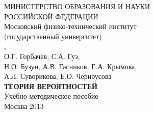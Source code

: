 \begin{center}

МИНИСТЕРСТВО ОБРАЗОВАНИЯ И НАУКИ \\
РОССИЙСКОЙ ФЕДЕРАЦИИ \\

 $ $ \\

Московский физико-технический институт \\
(государственный университет) \\
 
  $ $ \\ $ $ \\ $ $ \\
  $ $ \\
[А.А. Натан], \\
О.Г. Горбачев, С.А. Гуз, \\
Н.О. Бузун, А.В. Гасников, Е.А. Крымова, \\
А.Л. Суворикова, Е.О. Черноусова \\
 
 $ $ \\ $ $ \\
 
\textbf{ТЕОРИЯ ВЕРОЯТНОСТЕЙ} \\
 
 $ $ \\
  $ $ \\
  $ $ \\
Учебно-методическое пособие \\
 
  $ $ \\ $ $ \\ $ $ \\ $ $ \\
 $ $ \\ $ $ \\ $ $ \\ $ $ \\ $ $ \\ $ $ \\
 
Москва 2013


\end{center}

\newpage